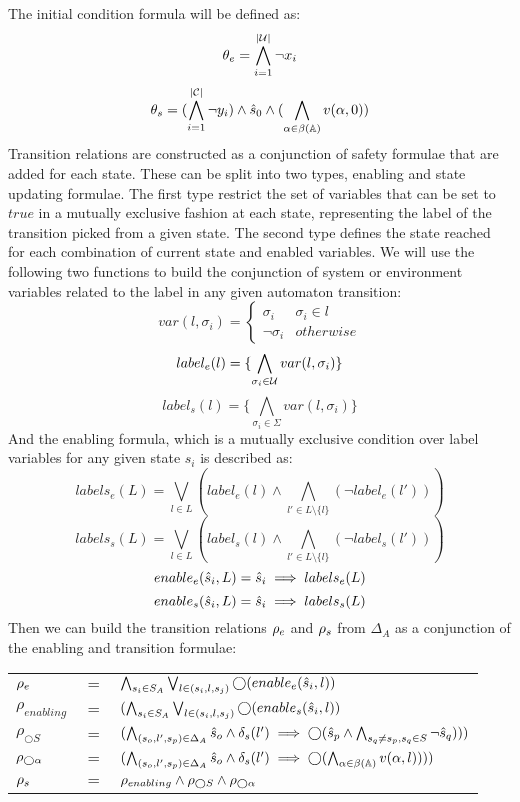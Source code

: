 The initial condition formula will be defined as:
\[{\theta_e} = \bigwedge_{i = 1}^{|\mathcal{U}|}\neg x_i\]
\[{\theta_s} = (\bigwedge_{i = 1}^{|\mathcal{C}|}\neg y_i) \wedge \hat{s}_{0} \wedge (\bigwedge_{\alpha \in \beta(\mathbb{A})}v(\alpha,0))\]
Transition relations are constructed as a conjunction of safety formulae that are added for each state. These can be split into two types, enabling and state updating formulae. The first type restrict the set of variables that can be set to $true$ in a mutually exclusive fashion at each state, representing the label of the transition picked from a given state. The second type defines the state reached for each combination of current state and enabled variables. 
We will use the following two functions to build the conjunction of system or environment variables related to the label in any given automaton transition:
\[
var(l, \sigma_i) = \begin{cases}
\sigma_i & \sigma_i \in l \\
\neg \sigma_i & otherwise
\end{cases}
\]
\[label_e(l) = \{\bigwedge_{\sigma_i \in \mathcal{U}}var(l, \sigma_i)\}\]
\[label_s(l) = \{\bigwedge_{\sigma_i \in \Sigma}var(l, \sigma_i)\}\]
And the enabling formula, which is a mutually exclusive condition over label variables for any given state $s_i$ is described as:
\[labels_e(L) = \bigvee_{l \in L}(label_e(l) \wedge \bigwedge_{l' \in L \setminus \{l\}}(\neg label_e(l')) ) \]
\[labels_s(L) = \bigvee_{l \in L}(label_s(l) \wedge \bigwedge_{l' \in L \setminus \{l\}}(\neg label_s(l')) ) \]
\[enable_e(\hat{s}_{i},L) = \hat{s}_{i} \implies labels_e(L) \]
\[enable_s(\hat{s}_{i},L) = \hat{s}_{i} \implies labels_s(L) \]
Then we can build the transition relations ${\rho_e}$ and ${\rho_s}$ from $\Delta_A$ as a conjunction of the enabling and transition formulae:


\begin{tabular}{ l c l }
	${\rho_e}$ &$=$& $\bigwedge_{s_i \in S_A} \bigvee_{l \in (s_i,l,s_j)}\bigcirc(enable_e(\hat{s}_{i},l))$\\
	$\rho_{enabling}$ &$=$&$(\bigwedge_{s_i \in S_A} \bigvee_{l \in (s_i,l,s_j)}\bigcirc(enable_s(\hat{s}_{i},l))$\\
	$\rho_{\bigcirc S}$&$=$&$(\bigwedge_{(s_o,l',s_p) \in \Delta_A} \hat{s}_{o} \wedge \delta_s(l') \implies \bigcirc(\hat{s}_{p} \wedge\bigwedge_{s_q \neq s_p, s_q \in S}\neg \hat{s}_{q}) ) )$\\
	$\rho_{\bigcirc \alpha}$&$=$&$(\bigwedge_{(s_o,l',s_p) \in \Delta_A} \hat{s}_{o} \wedge \delta_s(l') \implies \bigcirc(\bigwedge_{\alpha \in \beta(\mathbb{A})}v(\alpha,l) ) ) )$\\	
	${\rho_s}$&$=$&$\rho_{enabling} \wedge  \rho_{\bigcirc S} \wedge  \rho_{\bigcirc \alpha}$\\	
\end{tabular}

